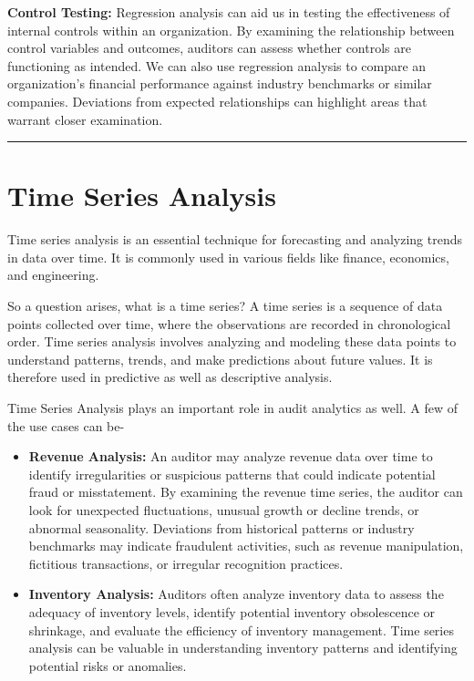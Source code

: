 \documentclass[
]{book}
\providecommand{\tightlist}{%
  \setlength{\itemsep}{0pt}\setlength{\parskip}{0pt}}
\begin{document}
\textbf{Control Testing:} Regression analysis can aid us in testing the effectiveness of internal controls within an organization. By examining the relationship between control variables and outcomes, auditors can assess whether controls are functioning as intended. We can also use regression analysis to compare an organization's financial performance against industry benchmarks or similar companies. Deviations from expected relationships can highlight areas that warrant closer examination.

\begin{center}\rule{0.5\linewidth}{0.5pt}\end{center}

\hypertarget{time-series-analysis}{%
\chapter{Time Series Analysis}\label{time-series-analysis}}

Time series analysis is an essential technique for forecasting and analyzing trends in data over time. It is commonly used in various fields like finance, economics, and engineering.

So a question arises, what is a time series? A time series is a sequence of data points collected over time, where the observations are recorded in chronological order. Time series analysis involves analyzing and modeling these data points to understand patterns, trends, and make predictions about future values. It is therefore used in predictive as well as descriptive analysis.

Time Series Analysis plays an important role in audit analytics as well. A few of the use cases can be-

\begin{itemize}
\tightlist
\item
  \textbf{Revenue Analysis:} An auditor may analyze revenue data over time to identify irregularities or suspicious patterns that could indicate potential fraud or misstatement. By examining the revenue time series, the auditor can look for unexpected fluctuations, unusual growth or decline trends, or abnormal seasonality. Deviations from historical patterns or industry benchmarks may indicate fraudulent activities, such as revenue manipulation, fictitious transactions, or irregular recognition practices.
\item
  \textbf{Inventory Analysis:} Auditors often analyze inventory data to assess the adequacy of inventory levels, identify potential inventory obsolescence or shrinkage, and evaluate the efficiency of inventory management. Time series analysis can be valuable in understanding inventory patterns and identifying potential risks or anomalies.
\end{itemize}
\end{document}
